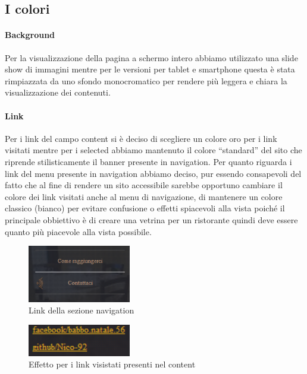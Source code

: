 \subsection{I colori}

\paragraph{Background}

Per la visualizzazione della pagina a schermo intero abbiamo utilizzato una slide show di immagini mentre per le versioni per tablet e smartphone questa è stata rimpiazzata da uno sfondo monocromatico per rendere più leggera e chiara la visualizzazione dei contenuti.

\paragraph{Link}

Per i link del campo content si è deciso di scegliere un colore oro per i link visitati mentre per i selected abbiamo mantenuto il colore “standard” del sito che riprende stilisticamente il banner presente in navigation. Per quanto riguarda i link del menu presente in navigation abbiamo deciso, pur essendo consapevoli del fatto che al fine di rendere un sito accessibile sarebbe opportuno cambiare il colore dei link visitati anche al menu di navigazione, di mantenere un colore classico (bianco) per evitare confusione o effetti spiacevoli alla vista poiché il principale obbiettivo è di creare una vetrina per un ristorante quindi deve essere quanto più piacevole alla vista possibile. 

\begin{figure}[H]
		\centering \includegraphics[width=0.4\textwidth]{images/link-navigation.png}
		\caption{Link della sezione navigation}
\end{figure}

\begin{figure}[H]
		\centering \includegraphics[width=0.4\textwidth]{images/link-content.png}
		\caption{Effetto per i link visistati presenti nel content}
\end{figure}

